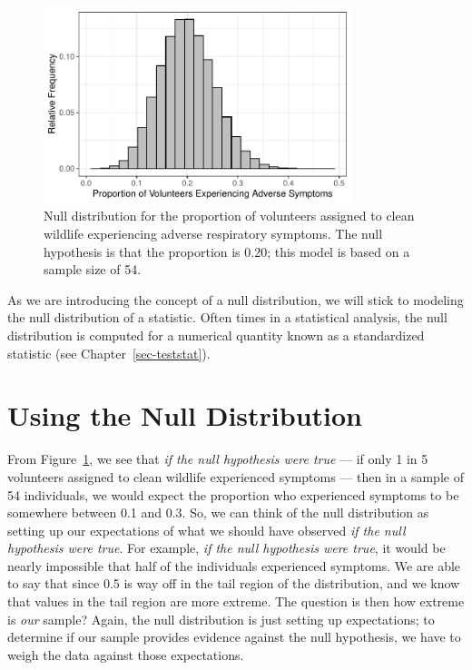 \documentclass[
  letterpaper,
  DIV=11,
  numbers=noendperiod]{scrreprt}
\theoremstyle{definition}
\theoremstyle{definition}
\theoremstyle{plain}
\theoremstyle{remark}
\begin{document}
\begin{figure}

{\centering \includegraphics[width=0.8\textwidth,height=\textheight]{./images/fig-nulldistns-deepwater-null-1.pdf}

}

\caption{\label{fig-nulldistns-deepwater-null}Null distribution for the
proportion of volunteers assigned to clean wildlife experiencing adverse
respiratory symptoms. The null hypothesis is that the proportion is
0.20; this model is based on a sample size of 54.}

\end{figure}

As we are introducing the concept of a null distribution, we will stick
to modeling the null distribution of a statistic. Often times in a
statistical analysis, the null distribution is computed for a numerical
quantity known as a standardized statistic (see
Chapter~\ref{sec-teststat}).

\hypertarget{using-the-null-distribution}{%
\section{Using the Null
Distribution}\label{using-the-null-distribution}}

From Figure~\ref{fig-nulldistns-deepwater-null}, we see that \emph{if
the null hypothesis were true} --- if only 1 in 5 volunteers assigned to
clean wildlife experienced symptoms --- then in a sample of 54
individuals, we would expect the proportion who experienced symptoms to
be somewhere between 0.1 and 0.3. So, we can think of the null
distribution as setting up our expectations of what we should have
observed \emph{if the null hypothesis were true}. For example, \emph{if
the null hypothesis were true}, it would be nearly impossible that half
of the individuals experienced symptoms. We are able to say that since
0.5 is way off in the tail region of the distribution, and we know that
values in the tail region are more extreme. The question is then how
extreme is \emph{our} sample? Again, the null distribution is just
setting up expectations; to determine if our sample provides evidence
against the null hypothesis, we have to weigh the data against those
expectations.
\end{document}
